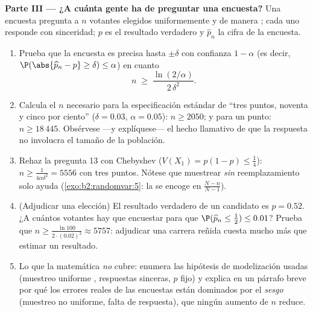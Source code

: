 \begin{problem}
\medskip
\noindent\textbf{Parte III --- ¿A cuánta gente ha de preguntar una
encuesta?} Una encuesta pregunta a $n$ votantes elegidos
uniformemente y de manera ; cada uno responde con
sinceridad; $p$ es el resultado verdadero y $\widehat p_n$ la cifra
de la encuesta.
\begin{enumerate}[resume]
  \item Prueba que la encuesta es precisa hasta $\pm\delta$ con
        confianza $1 - \alpha$ (es decir, $\P(\abs{\widehat p_n - p}
        \geq \delta) \leq \alpha$) en cuanto
        \[
        n \;\geq\; \frac{\ln(2/\alpha)}{2\,\delta^2} .
        \]
  \item Calcula el $n$ necesario para la especificación estándar de
        ``tres puntos, noventa y cinco por ciento'' ($\delta = 0.03$,
        $\alpha = 0.05$): $n \geq 2050$; y para un punto: $n \geq
        18\,445$. Obsérvese ---y explíquese--- el hecho llamativo de
        que la respuesta no involucra el tamaño de la población.
  \item Rehaz la pregunta 13 con Chebyshev ($V(X_1) = p(1-p) \leq
        \frac14$): $n \geq \frac1{4\alpha\delta^2} = 5556$ con tres
        puntos. Nótese que muestrear \emph{sin} reemplazamiento solo
        ayuda (\cref{exo:b2:randomvar:5}: la  se encoge en
        $\frac{N-n}{N-1}$).
  \item (Adjudicar una elección) El resultado verdadero de un
        candidato es $p = 0.52$. ¿A cuántos votantes hay que
        encuestar para que $\P(\widehat p_n \leq \tfrac12) \leq
        0.01$? Prueba que $n \geq \frac{\ln 100}{2\cdot(0.02)^2}
        \approx 5757$: adjudicar una carrera reñida cuesta mucho más
        que estimar un resultado.
  \item Lo que la matemática \emph{no} cubre: enumera las hipótesis
        de modelización usadas (muestreo uniforme ,
        respuestas sinceras, $p$ fijo) y explica en un párrafo breve
        por qué los errores reales de las encuestas están dominados
        por el \emph{sesgo} (muestreo no uniforme, falta de
        respuesta), que ningún aumento de $n$ reduce.
\end{enumerate}


\end{problem}
